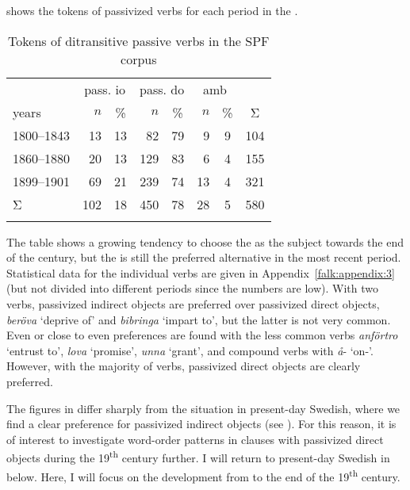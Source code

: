 \documentclass[output=paper]{langscibook}
\begin{document}
 shows the tokens of passivized  verbs for each period in the .

\begin{table}
\caption{Tokens of ditransitive passive verbs in the SPF corpus\label{tab:falk:3}}
\begin{tabular}{lrcrcrcc}
\lsptoprule
          & \multicolumn{2}{c}{pass. io} & \multicolumn{2}{c}{pass. do} & \multicolumn{2}{c}{amb} & \\\cmidrule(lr){2-3}\cmidrule(lr){4-5}\cmidrule(lr){6-7}
years     & $n$ & \%     & $n$ & \%   & $n$ & \% & Σ\\\midrule
1800–1843 & 13  &  13  & 82  & 79 & 9  & 9 & 104\\
1860–1880 & 20  &  13  & 129 & 83 & 6  & 4 & 155\\
1899–1901 & 69  &  21  & 239 & 74 & 13 & 4 & 321\\
Σ         & 102 &  18  & 450 & 78 & 28 & 5 & 580\\
\lspbottomrule
\end{tabular}
\end{table}

The table shows a growing tendency to choose the  as the subject towards the end of the century, but the  is still the preferred alternative in the most recent period. Statistical data for the individual verbs are given in Appendix~\ref{falk:appendix:3} (but not divided into different periods since the numbers are low). With two verbs, passivized indirect objects are preferred over passivized direct objects, \textit{beröva} ‘deprive of’ and \textit{bibringa} ‘impart to’, but the latter is not very common. Even or close to even preferences are found with the less common verbs \textit{anförtro} ‘entrust to’, \textit{lova} ‘promise’, \textit{unna} ‘grant’, and compound verbs with \textit{å}{}- ‘on-’. However, with the majority of verbs, passivized direct objects are clearly preferred.\largerpage


The figures in  differ sharply from the situation in present-day Swedish, where we find a clear preference for passivized indirect objects (see ). For this reason, it is of interest to investigate word-order patterns in clauses with passivized direct objects during the 19\textsuperscript{th} century further. I will return to present-day Swedish in  below. Here, I will focus on the development from  to the end of the 19\textsuperscript{th} century.
\end{document}

